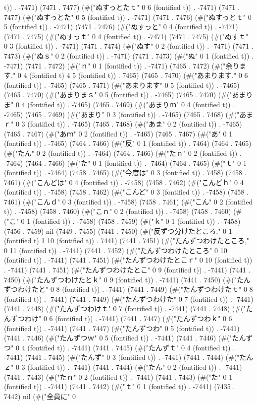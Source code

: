 t)) . -7471) (7471 . 7477) (#("ぬすっとたｔ" 0 6 (fontified t)) . -7471) (7471 . 7477) (#("ぬすっとた" 0 5 (fontified t)) . -7471) (7471 . 7476) (#("ぬすっとｔ" 0 5 (fontified t)) . -7471) (7471 . 7476) (#("ぬすっと" 0 4 (fontified t)) . -7471) (7471 . 7475) (#("ぬすっｔ" 0 4 (fontified t)) . -7471) (7471 . 7475) (#("ぬすｔ" 0 3 (fontified t)) . -7471) (7471 . 7474) (#("ぬす" 0 2 (fontified t)) . -7471) (7471 . 7473) (#("ぬｓ" 0 2 (fontified t)) . -7471) (7471 . 7473) (#("ぬ" 0 1 (fontified t)) . -7471) (7471 . 7472) (#("ｎ" 0 1 (fontified t)) . -7471) (7465 . 7472) (#("余ります." 0 4 (fontified t) 4 5 (fontified t)) . 7465) (7465 . 7470) (#("あまります." 0 6 (fontified t)) . -7465) (7465 . 7471) (#("あまります" 0 5 (fontified t)) . -7465) (7465 . 7470) (#("あまりまｓ" 0 5 (fontified t)) . -7465) (7465 . 7470) (#("あまりま" 0 4 (fontified t)) . -7465) (7465 . 7469) (#("あまりｍ" 0 4 (fontified t)) . -7465) (7465 . 7469) (#("あまり" 0 3 (fontified t)) . -7465) (7465 . 7468) (#("あまｒ" 0 3 (fontified t)) . -7465) (7465 . 7468) (#("あま" 0 2 (fontified t)) . -7465) (7465 . 7467) (#("あｍ" 0 2 (fontified t)) . -7465) (7465 . 7467) (#("あ" 0 1 (fontified t)) . -7465) (7464 . 7466) (#("反" 0 1 (fontified t)) . 7464) (7464 . 7465) (#("たん" 0 2 (fontified t)) . -7464) (7464 . 7466) (#("たｎ" 0 2 (fontified t)) . -7464) (7464 . 7466) (#("た" 0 1 (fontified t)) . -7464) (7464 . 7465) (#("ｔ" 0 1 (fontified t)) . -7464) (7458 . 7465) (#("今度は" 0 3 (fontified t)) . 7458) (7458 . 7461) (#("こんどは" 0 4 (fontified t)) . -7458) (7458 . 7462) (#("こんどｈ" 0 4 (fontified t)) . -7458) (7458 . 7462) (#("こんど" 0 3 (fontified t)) . -7458) (7458 . 7461) (#("こんｄ" 0 3 (fontified t)) . -7458) (7458 . 7461) (#("こん" 0 2 (fontified t)) . -7458) (7458 . 7460) (#("こｎ" 0 2 (fontified t)) . -7458) (7458 . 7460) (#("こ" 0 1 (fontified t)) . -7458) (7458 . 7459) (#("ｋ" 0 1 (fontified t)) . -7458) (7456 . 7459) nil (7449 . 7455) (7441 . 7450) (#("反ずつ分けたところ," 0 1 (fontified t) 1 10 (fontified t)) . 7441) (7441 . 7451) (#("たんずつわけたところ," 0 11 (fontified t)) . -7441) (7441 . 7452) (#("たんずつわけたところ" 0 10 (fontified t)) . -7441) (7441 . 7451) (#("たんずつわけたとこｒ" 0 10 (fontified t)) . -7441) (7441 . 7451) (#("たんずつわけたとこ" 0 9 (fontified t)) . -7441) (7441 . 7450) (#("たんずつわけたとｋ" 0 9 (fontified t)) . -7441) (7441 . 7450) (#("たんずつわけたと" 0 8 (fontified t)) . -7441) (7441 . 7449) (#("たんずつわけたｔ" 0 8 (fontified t)) . -7441) (7441 . 7449) (#("たんずつわけた" 0 7 (fontified t)) . -7441) (7441 . 7448) (#("たんずつわけｔ" 0 7 (fontified t)) . -7441) (7441 . 7448) (#("たんずつわけ" 0 6 (fontified t)) . -7441) (7441 . 7447) (#("たんずつわｋ" 0 6 (fontified t)) . -7441) (7441 . 7447) (#("たんずつわ" 0 5 (fontified t)) . -7441) (7441 . 7446) (#("たんずつｗ" 0 5 (fontified t)) . -7441) (7441 . 7446) (#("たんずつ" 0 4 (fontified t)) . -7441) (7441 . 7445) (#("たんずｔ" 0 4 (fontified t)) . -7441) (7441 . 7445) (#("たんず" 0 3 (fontified t)) . -7441) (7441 . 7444) (#("たんｚ" 0 3 (fontified t)) . -7441) (7441 . 7444) (#("たん" 0 2 (fontified t)) . -7441) (7441 . 7443) (#("たｎ" 0 2 (fontified t)) . -7441) (7441 . 7443) (#("た" 0 1 (fontified t)) . -7441) (7441 . 7442) (#("ｔ" 0 1 (fontified t)) . -7441) (7435 . 7442) nil (#("全員に" 0 